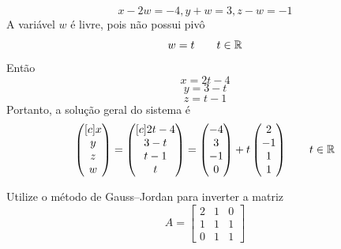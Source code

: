 \documentclass[a4paper,12pt,fleqn]{article}
\begin{document}
\begin{answer}
\[{    x-2w=-4,
    y+w=3,
    z-w=-1
  }
\]
A variável $w$ é livre, pois não possui pivô
\[
  w=t
  \qquad t \in \mathbb{R}
\]
Então
\[
  x=2t-4
\]
\[
  y=3-t
\]
\[
  z=t-1
\]
Portanto, a solução geral do sistema é
\[
  \begin{pmatrix}[c]
    x \\
    y \\
    z \\
    w
  \end{pmatrix}
  =
  \begin{pmatrix}[c]
    2t - 4 \\
    3 - t  \\
    t - 1  \\
    t
  \end{pmatrix}
  =
  \begin{pmatrix}
    -4 \\
    3  \\
    -1 \\
    0
  \end{pmatrix}
  +
  t
  \begin{pmatrix}
    2  \\
    -1 \\
    1  \\
    1
  \end{pmatrix}
  \qquad t \in \mathbb{R}
\]
\end{answer}

Utilize o método de Gauss--Jordan para inverter a matriz
\[
  A =
  \begin{bmatrix}
    2 & 1 & 0 \\
    1 & 1 & 1 \\
    0 & 1 & 1
  \end{bmatrix}
\]
\end{document}
